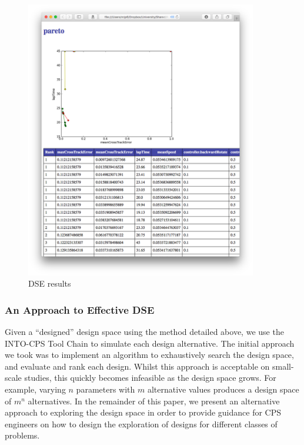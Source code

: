 \begin{figure}[h!]
	\centering
	\includegraphics[width=0.9\textwidth]{figures/dse_results}
	\caption{DSE results}
	\label{fig:dse-results}
\end{figure}

\subsubsection{An Approach to Effective DSE}
\label{sec:dse-algorithms}

Given a ``designed'' design space using the method detailed above, we use the INTO-CPS Tool Chain to simulate each design alternative. The initial approach we took was to implement an algorithm to exhaustively search the design space, and evaluate and rank each design. Whilst this approach is acceptable on small-scale studies, this quickly becomes infeasible as the design space grows. For example, varying $n$ parameters with $m$ alternative values produces a design space of $m^n$ alternatives. In the remainder of this paper, we present an alternative approach to exploring the design space in order to provide guidance for CPS engineers on how to design the exploration of designs for different classes of problems.


